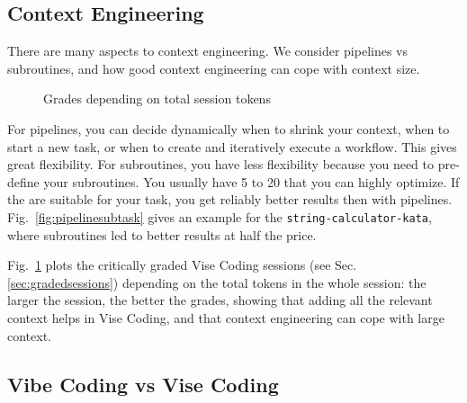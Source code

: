 \documentclass[twocolumn,german]{article}
\begin{document}
\subsection{Context Engineering}

There are many aspects to context engineering. We consider pipelines vs subroutines, and how good context engineering can cope with context size.

\begin{figure}[hbt!]
  \begin{center}
  \vspace{-1mm}
  \vspace{-5mm}
\caption{Grades depending on total session tokens}
\label{fig:evaltool}
\end{center}
\end{figure}

For pipelines, you can decide dynamically when to shrink your context, when to start a new task, or when to create and iteratively execute a workflow.
This gives great flexibility. For subroutines, you have less flexibility because you need to pre-define your subroutines. You usually have 5 to 20 that you can highly optimize. If the are suitable for your task, you get reliably better results then with pipelines. 
Fig.~\ref{fig:pipelinesubtask} gives an example for the \lstinline|string-calculator-kata|, where subroutines led to better results at half the price.

Fig.~\ref{fig:evaltool} plots the critically graded Vise Coding sessions (see Sec.\ref{sec:gradedsessions}) depending on the total tokens in the whole session:
the larger the session, the better the grades, showing that adding all the relevant context helps in Vise Coding, and that context engineering can cope with large context.


\subsection{Vibe Coding vs Vise Coding}
\end{document}
